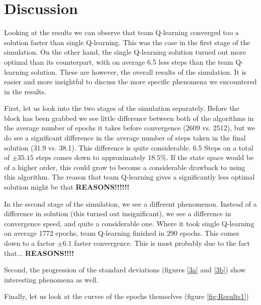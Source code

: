 \section{Discussion}
Looking at the results we can observe that team Q-learning converged too a solution faster than single Q-learning. This was the case in the first stage of the simulation. On the other hand, the single Q-learning solution turned out more optimal than its counterpart, with on average 6.5 less steps than the team Q-learning solution. These are however, the overall results of the simulation. It is easier and more insightful to discuss the more specific phenomena we encountered in the results.

First, let us look into the two stages of the simulation separately. Before the block has been grabbed we see little difference between both of the algorithms in the average number of epochs it takes before convergence (2609 vs. 2512), but we do see a significant difference in the average number of steps taken in the final solution (31.9 vs. 38.1). This difference is quite considerable. 6.5 Steps on a total of $\pm 35.15$ steps comes down to approximately $18.5\%$. If the state space would be of a higher order, this could grow to become a considerable drawback to using this algorithm. The reason that team Q-learning gives a significantly less optimal solution might be that \textbf{REASONS!!!!!!}

In the second stage of the simulation, we see a different phenomenon. Instead of a difference in solution (this turned out insignificant), we see a difference in convergence speed, and quite a considerable one. Where it took single Q-learning on average 1772 epochs, team Q-learning finished in 290 epochs. This comes down to a factor $\pm 6.1$ faster convergence. This is most probably due to the fact that... \textbf{REASONS!!!!}

Second, the progression of the standard deviations (figures \ref{3a} and \ref{3b}) show interesting phenomena as well.

Finally, let us look at the curves of the epochs themselves (figure \ref{fig:Results1})